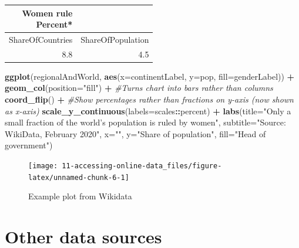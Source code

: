 \documentclass[
]{book}
\newenvironment{Shaded}{\begin{snugshade}}{\end{snugshade}}
\newcommand{\CommentTok}[1]{\textcolor[rgb]{0.56,0.35,0.01}{\textit{#1}}}
\newcommand{\DataTypeTok}[1]{\textcolor[rgb]{0.13,0.29,0.53}{#1}}
\newcommand{\KeywordTok}[1]{\textcolor[rgb]{0.13,0.29,0.53}{\textbf{#1}}}
\newcommand{\NormalTok}[1]{#1}
\newcommand{\OperatorTok}[1]{\textcolor[rgb]{0.81,0.36,0.00}{\textbf{#1}}}
\newcommand{\StringTok}[1]{\textcolor[rgb]{0.31,0.60,0.02}{#1}}
\begin{document}
\captionsetup[table]{labelformat=empty,skip=1pt}
\begin{longtable}{rr}
\caption*{
\large \textbf{Women rule}\\ 
\small *Percent*\\ 
} \\ 
\toprule
ShareOfCountries & ShareOfPopulation \\ 
\midrule
8.8 & 4.5 \\ 
\bottomrule
\end{longtable}

\begin{Shaded}
\begin{Highlighting}[]
\KeywordTok{ggplot}\NormalTok{(regionalAndWorld, }\KeywordTok{aes}\NormalTok{(}\DataTypeTok{x=}\NormalTok{continentLabel, }\DataTypeTok{y=}\NormalTok{pop, }\DataTypeTok{fill=}\NormalTok{genderLabel)) }\OperatorTok{+}\StringTok{ }\KeywordTok{geom_col}\NormalTok{(}\DataTypeTok{position=}\StringTok{"fill"}\NormalTok{) }\OperatorTok{+}\StringTok{ }
\StringTok{    }\CommentTok{#Turns chart into bars rather than columns}
\StringTok{    }\KeywordTok{coord_flip}\NormalTok{() }\OperatorTok{+}
\StringTok{    }\CommentTok{#Show percentages rather than fractions on y-axis (now shown as x-axis)}
\StringTok{    }\KeywordTok{scale_y_continuous}\NormalTok{(}\DataTypeTok{labels=}\NormalTok{scales}\OperatorTok{::}\NormalTok{percent) }\OperatorTok{+}
\StringTok{    }\KeywordTok{labs}\NormalTok{(}\DataTypeTok{title=}\StringTok{"Only a small fraction of the world's population is ruled by women"}\NormalTok{, }\DataTypeTok{subtitle=}\StringTok{"Source: WikiData, February 2020"}\NormalTok{, }\DataTypeTok{x=}\StringTok{""}\NormalTok{, }\DataTypeTok{y=}\StringTok{"Share of population"}\NormalTok{, }\DataTypeTok{fill=}\StringTok{"Head of government"}\NormalTok{)}
\end{Highlighting}
\end{Shaded}

\begin{figure}

{\centering \texttt{[image: 11-accessing-online-data\_files/figure-latex/unnamed-chunk-6-1]} 

}

\caption{Example plot from Wikidata}\label{fig:unnamed-chunk-6}
\end{figure}

\hypertarget{other-data-sources}{%
\section{Other data sources}\label{other-data-sources}}
\end{document}
